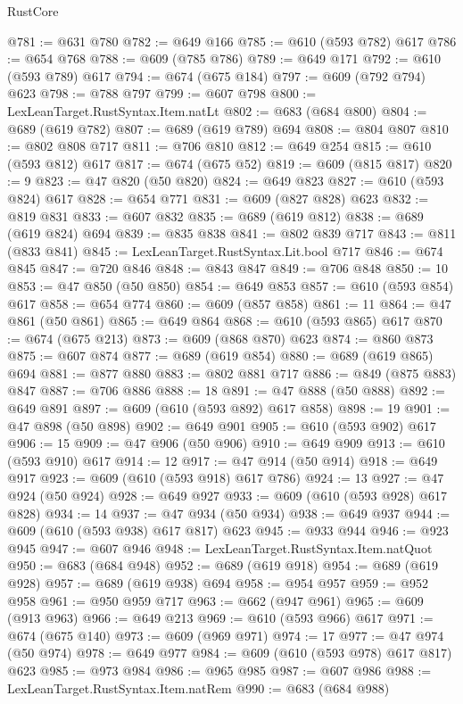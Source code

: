 \begin{lexlean}{RustCore}
\begin{coremodule}
@781 := @631 @780
@782 := @649 @166
@785 := @610 (@593 @782) @617
@786 := @654 @768
@788 := @609 (@785 @786)
@789 := @649 @171
@792 := @610 (@593 @789) @617
@794 := @674 (@675 @184)
@797 := @609 (@792 @794) @623
@798 := @788 @797
@799 := @607 @798
@800 := LexLeanTarget.RustSyntax.Item.natLt
@802 := @683 (@684 @800)
@804 := @689 (@619 @782)
@807 := @689 (@619 @789) @694
@808 := @804 @807
@810 := @802 @808 @717
@811 := @706 @810
@812 := @649 @254
@815 := @610 (@593 @812) @617
@817 := @674 (@675 @52)
@819 := @609 (@815 @817)
@820 := 9
@823 := @47 @820 (@50 @820)
@824 := @649 @823
@827 := @610 (@593 @824) @617
@828 := @654 @771
@831 := @609 (@827 @828) @623
@832 := @819 @831
@833 := @607 @832
@835 := @689 (@619 @812)
@838 := @689 (@619 @824) @694
@839 := @835 @838
@841 := @802 @839 @717
@843 := @811 (@833 @841)
@845 := LexLeanTarget.RustSyntax.Lit.bool @717
@846 := @674 @845
@847 := @720 @846
@848 := @843 @847
@849 := @706 @848
@850 := 10
@853 := @47 @850 (@50 @850)
@854 := @649 @853
@857 := @610 (@593 @854) @617
@858 := @654 @774
@860 := @609 (@857 @858)
@861 := 11
@864 := @47 @861 (@50 @861)
@865 := @649 @864
@868 := @610 (@593 @865) @617
@870 := @674 (@675 @213)
@873 := @609 (@868 @870) @623
@874 := @860 @873
@875 := @607 @874
@877 := @689 (@619 @854)
@880 := @689 (@619 @865) @694
@881 := @877 @880
@883 := @802 @881 @717
@886 := @849 (@875 @883) @847
@887 := @706 @886
@888 := 18
@891 := @47 @888 (@50 @888)
@892 := @649 @891
@897 := @609 (@610 (@593 @892) @617 @858)
@898 := 19
@901 := @47 @898 (@50 @898)
@902 := @649 @901
@905 := @610 (@593 @902) @617
@906 := 15
@909 := @47 @906 (@50 @906)
@910 := @649 @909
@913 := @610 (@593 @910) @617
@914 := 12
@917 := @47 @914 (@50 @914)
@918 := @649 @917
@923 := @609 (@610 (@593 @918) @617 @786)
@924 := 13
@927 := @47 @924 (@50 @924)
@928 := @649 @927
@933 := @609 (@610 (@593 @928) @617 @828)
@934 := 14
@937 := @47 @934 (@50 @934)
@938 := @649 @937
@944 := @609 (@610 (@593 @938) @617 @817) @623
@945 := @933 @944
@946 := @923 @945
@947 := @607 @946
@948 := LexLeanTarget.RustSyntax.Item.natQuot
@950 := @683 (@684 @948)
@952 := @689 (@619 @918)
@954 := @689 (@619 @928)
@957 := @689 (@619 @938) @694
@958 := @954 @957
@959 := @952 @958
@961 := @950 @959 @717
@963 := @662 (@947 @961)
@965 := @609 (@913 @963)
@966 := @649 @213
@969 := @610 (@593 @966) @617
@971 := @674 (@675 @140)
@973 := @609 (@969 @971)
@974 := 17
@977 := @47 @974 (@50 @974)
@978 := @649 @977
@984 := @609 (@610 (@593 @978) @617 @817) @623
@985 := @973 @984
@986 := @965 @985
@987 := @607 @986
@988 := LexLeanTarget.RustSyntax.Item.natRem
@990 := @683 (@684 @988)

\end{coremodule}
\end{lexlean}
